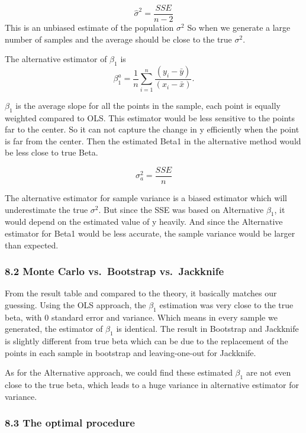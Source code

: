 \documentclass[
]{article}
\begin{document}
\[\hat\sigma^2 = \frac{SSE}{n-2}\] This is an unbiased estimate of the
population \(\sigma^2\) So when we generate a large number of samples
and the average should be close to the true \(\sigma^2.\)

The alternative estimator of \(\beta_1\) is
\[\beta_1^a = \frac{1}{n}\sum_{i=1}^{n}\frac{(y_i-\bar{y})}{(x_i-\bar{x})}.\]

\(\beta_1\) is the average slope for all the points in the sample, each
point is equally weighted compared to OLS. This estimator would be less
sensitive to the points far to the center. So it can not capture the
change in y efficiently when the point is far from the center. Then the
estimated Beta1 in the alternative method would be less close to true
Beta.

\[\sigma^2_a = \frac{SSE}{n}\]

The alternative estimator for sample variance is a biased estimator
which will underestimate the true \(\sigma^2\). But since the SSE was
based on Alternative \(\beta_1\), it would depend on the estimated value
of y heavily. And since the Alternative estimator for Beta1 would be
less accurate, the sample variance would be larger than expected.

\hypertarget{monte-carlo-vs.-bootstrap-vs.-jackknife}{%
\subsubsection{8.2 Monte Carlo vs.~Bootstrap
vs.~Jackknife}\label{monte-carlo-vs.-bootstrap-vs.-jackknife}}

From the result table and compared to the theory, it basically matches
our guessing. Using the OLS approach, the \(\beta_1\) estimation was
very close to the true beta, with 0 standard error and variance. Which
means in every sample we generated, the estimator of \(\beta_1\) is
identical. The result in Bootstrap and Jackknife is slightly different
from true beta which can be due to the replacement of the points in each
sample in bootstrap and leaving-one-out for Jackknife.

As for the Alternative approach, we could find these estimated
\(\beta_1\) are not even close to the true beta, which leads to a huge
variance in alternative estimator for variance.

\hypertarget{the-optimal-procedure}{%
\subsubsection{8.3 The optimal procedure}\label{the-optimal-procedure}}
\end{document}
